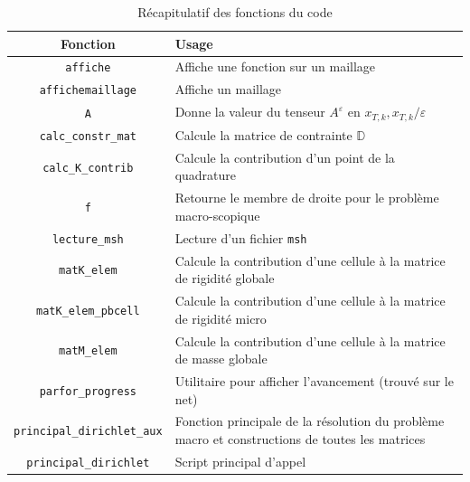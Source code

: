 \documentclass[11pt]{article}
\newcommand{\D}{\mathbb{D}}
\newcommand{\Ae}{A^\varepsilon}
\newcommand{\xtk}{x_{T,k}}
\begin{document}
\begin{table}
  \centering
  \begin{tabular}{c|p{}}
    Fonction                           & Usage                                                                                          \\
    \hline \hline
    \texttt{affiche}                   & Affiche une fonction sur un maillage                                                           \\
    \hline                 
    \texttt{affichemaillage}           & Affiche un maillage                                                                            \\
    \hline         
    \texttt{A}                         & Donne la valeur du tenseur $\Ae$ en $\xtk, \xtk/\varepsilon$                                   \\
    \hline                       
    \texttt{calc\_constr\_mat}         & Calcule la matrice de contrainte $\D$                                                          \\
    \hline         
    \texttt{calc\_K\_contrib}          & Calcule la contribution d'un point de la quadrature                                            \\
    \hline          
    \texttt{f}                         & Retourne le membre de droite pour le problème macro-scopique                                   \\
    \hline                 
    \texttt{lecture\_msh}              & Lecture d'un fichier \texttt{msh}                                                              \\
    \hline             
    \texttt{matK\_elem}                & Calcule la contribution d'une cellule à la matrice de rigidité globale                           \\
    \hline               
    \texttt{matK\_elem\_pbcell}        & Calcule la contribution d'une cellule à la matrice de rigidité micro                             \\
    \hline        
    \texttt{matM\_elem}                & Calcule la contribution d'une cellule à la matrice de masse globale                            \\
    \hline               
    \texttt{parfor\_progress}          & Utilitaire pour afficher l'avancement (trouvé sur le net)                                      \\
    \hline         
    \texttt{principal\_dirichlet\_aux} & Fonction principale de la résolution du problème macro et constructions de toutes les matrices \\
    \hline
    \texttt{principal\_dirichlet}      & Script principal d'appel                                                                       \\
    \hline     
  \end{tabular}
  \caption{Récapitulatif des fonctions du code}
  \label{tab:funcs}
\end{table}
\end{document}

